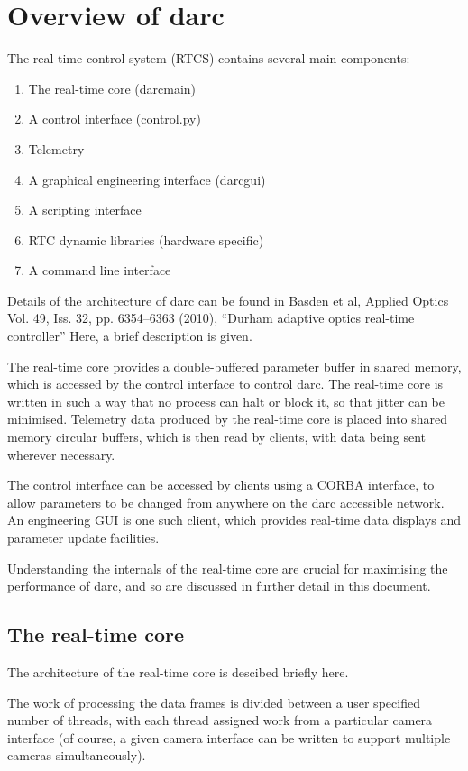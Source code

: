 \documentclass[a4,10pt]{article}
\newcommand{\rtcs}{real-time control system (RTCS)\renewcommand{\rtcs}{RTCS\xspace}\xspace}
\begin{document}
\section{Overview of darc}
The \rtcs contains several main components:
\begin{enumerate}
\item The real-time core (darcmain)
\item A control interface (control.py)
\item Telemetry
\item A graphical engineering interface (darcgui)
\item A scripting interface
\item RTC dynamic libraries (hardware specific)
\item A command line interface
\end{enumerate}

Details of the architecture of darc can be found in Basden et al,
Applied Optics Vol. 49, Iss. 32, pp. 6354–6363 (2010), ``Durham
adaptive optics real-time controller''
Here, a brief description is given.

The real-time core provides a double-buffered parameter buffer in
shared memory, which is accessed by the control interface to control
darc.  The real-time core is written in such a way that no process can
halt or block it, so that jitter can be minimised.  Telemetry data
produced by the real-time core is placed into shared memory circular
buffers, which is then read by clients, with data being sent wherever
necessary.  

The control interface can be accessed by clients using a CORBA
interface, to allow parameters to be changed from anywhere on the darc
accessible network.  An engineering GUI is one such client, which
provides real-time data displays and parameter update facilities.  

Understanding the internals of the real-time core are crucial for
maximising the performance of darc, and so are discussed in further
detail in this document.  

\subsection{The real-time core}

The architecture of the real-time core is descibed briefly here.

The work of processing the data frames is divided between a user
specified number of threads, with each thread assigned work from a
particular camera interface (of course, a given camera interface can
be written to support multiple cameras simultaneously).
\end{document}
